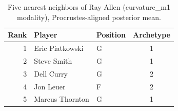 \begin{table}[htbp]
  \centering\small
  \begin{tabular}{rllc}
    \toprule
    Rank & Player & Position & Archetype \\
    \midrule
    1 & Eric Piatkowski & G & 1 \\
    2 & Steve Smith & G & 1 \\
    3 & Dell Curry & G & 2 \\
    4 & Jon Leuer & F & 2 \\
    5 & Marcus Thornton & G & 1 \\
    \bottomrule
  \end{tabular}
  \caption{Five nearest neighbors of Ray Allen (curvature_m1 modality), Procrustes-aligned posterior mean.}
  \label{tab:Ray_Allen_neighbors_curvature_m1}
\end{table}

